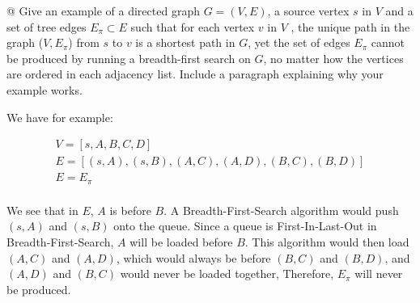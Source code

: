 \documentclass[10pt]{article}
\begin{document}
\begin{easylist}[enumerate]
    @ Give an example of a directed graph $G = (V, E)$, a source vertex $s$ in $V$ and a set of tree edges $E_{\pi}
    \subset E$ such that for each vertex $v$ in $V$ , the unique path in the graph ($V, E_{\pi}$) from $s$ to $v$ is a
    shortest path in $G$, yet the set of edges $E_{\pi}$ cannot be produced by running a breadth-first search on $G$, no
    matter how the vertices are ordered in each adjacency list. Include a paragraph explaining why your example works.

    We have for example:

    \[
        \begin{aligned}
            V = \left[s, A, B, C, D\right]\\
            E = \left[(s, A), (s, B), (A, C), (A, D), (B, C), (B, D)\right]\\
            E = E_{\pi}\\
        \end{aligned}
    \]

    We see that in $E$, $A$ is before $B$. A Breadth-First-Search algorithm would push $(s, A)$ and $(s, B)$ onto the
    queue. Since a queue is First-In-Last-Out in Breadth-First-Search, $A$ will be loaded before $B$. This algorithm
    would then load $(A, C)$ and $(A, D)$, which would always be before $(B, C)$ and $(B, D)$, and $(A, D)$ and $(B, C)$
    would never be loaded together, Therefore, $E_{\pi}$ will never be produced. 
\end{easylist}
\end{document}

